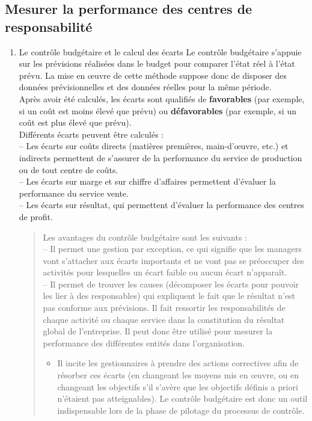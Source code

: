 \documentclass{tufte-handout}
\begin{document}
\subsection{Mesurer la performance des centres de responsabilité}
\label{sec:org966d3e3}
\begin{enumerate}
\item Le contrôle budgétaire et le calcul des écarts
\label{sec:org6c4feeb}
Le contrôle budgétaire s’appuie sur les prévisions réalisées dans le budget pour comparer l’état réel à l’état prévu. La mise en œuvre de cette méthode suppose donc de disposer des données prévisionnelles et des données réelles pour la même période.\\
Après avoir été calculés, les écarts sont qualifiés de \textbf{favorables} (par exemple, si un coût est moins élevé que prévu) ou \textbf{défavorables} (par exemple, si un coût est plus élevé que prévu).\\

Différents écarts peuvent être calculés :\\
– Les écarts sur coûts directs (matières premières, main-d’œuvre, etc.) et indirects permettent de s’assurer de la performance du service de production ou de tout centre de coûts.\\
– Les écarts sur marge et sur chiffre d’affaires permettent d’évaluer la performance du service vente.\\
– Les écarts sur résultat, qui permettent d’évaluer la performance des centres de profit.\\

\begin{quote}
Les avantages du contrôle budgétaire sont les suivants :\\
– Il permet une gestion par exception, ce qui signifie que les managers vont s’attacher aux écarts importants et ne vont pas se préoccuper des activités pour lesquelles un écart faible ou aucun écart n’apparaît.\\
– Il permet de trouver les causes (décomposer les écarts pour pouvoir les lier à des responsables) qui expliquent le fait que le résultat n'est pas conforme aux prévisions. Il fait ressortir les responsabilités de chaque activité ou chaque service dans la constitution du résultat global de l’entreprise. Il peut donc être utilisé pour mesurer la performance des différentes entités dans l’organisation.\\
\begin{itemize}
\item Il incite les gestionnaires à prendre des actions correctives afin de résorber ces écarts (en changeant les moyens mis en œuvre, ou en changeant les objectifs s’il s’avère que les objectifs définis a priori n’étaient pas atteignables). Le contrôle budgétaire est donc un outil indispensable lors de la phase de pilotage du processus de contrôle.\\
\end{itemize}
\end{quote}


\end{enumerate}
\end{document}
